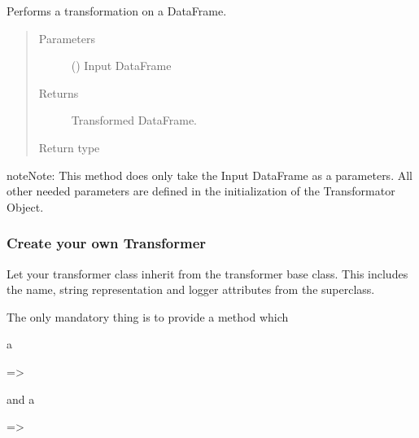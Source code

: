 \documentclass[a4paper,10pt, twoside,english]{sphinxmanual}
\begin{document}
\begin{fulllineitems}
\begin{fulllineitems}
\label{\detokenize{base_classes/transformer:spooq2.transformer.transformer.Transformer.transform}}
Performs a transformation on a DataFrame.
\begin{quote}\begin{description}
\item[{Parameters}] \leavevmode
{} () \textendash{} Input DataFrame

\item[{Returns}] \leavevmode
Transformed DataFrame.

\item[{Return type}] \leavevmode
{}

\end{description}\end{quote}

\begin{sphinxadmonition}{note}{Note:}
This method does only take the Input DataFrame as a parameters. All other needed parameters
are defined in the initialization of the Transformator Object.
\end{sphinxadmonition}

\end{fulllineitems}


\end{fulllineitems}



\subsubsection{Create your own Transformer}
\label{\detokenize{base_classes/transformer:create-your-own-transformer}}\label{\detokenize{base_classes/transformer:custom-transformer}}
Let your transformer class inherit from the transformer base class.
This includes the name, string representation and logger attributes from the superclass.

\begin{DUlineblock}{0em}
\item[] The only mandatory thing is to provide a  method which
\item[]  a
\item[] =\textgreater{} 
\item[] and  a
\item[] =\textgreater{} 
\end{DUlineblock}
\end{document}
